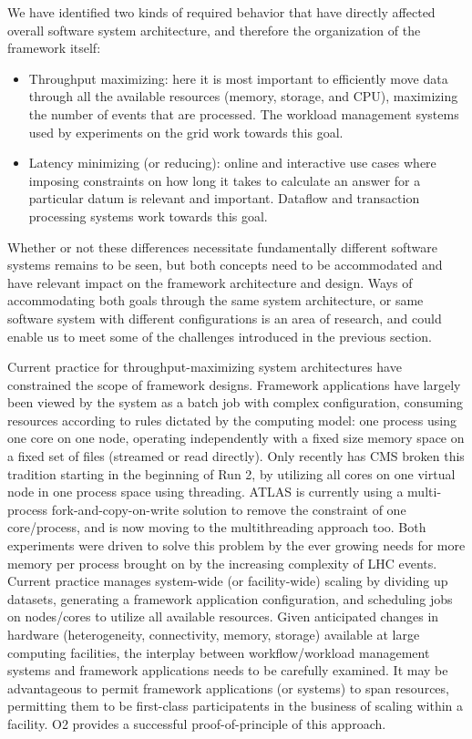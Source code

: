 \documentclass[12pt,a4paper]{article}
\begin{document}
We have identified two kinds of required behavior that have directly
affected overall software system architecture, and therefore the
organization of the framework itself:

\begin{itemize}
\item
    Throughput maximizing: here it is most important to efficiently
    move data through all the available resources (memory, storage,
    and CPU), maximizing the number of events that are processed. The
    workload management systems used by experiments on the grid work
    towards this goal.
\item
    Latency minimizing (or reducing): online and interactive use
    cases where imposing constraints on how long it takes to calculate
    an answer for a particular datum is relevant and
    important. Dataflow and transaction processing systems work
    towards this goal.
\end{itemize}

Whether or not these differences necessitate fundamentally different
software systems remains to be seen, but both concepts need to be
accommodated and have relevant impact on the framework architecture
and design. Ways of accommodating both goals through the same system
architecture, or same software system with different configurations is
an area of research, and could enable us to meet some of the
challenges introduced in the previous section.

Current practice for throughput-maximizing system architectures have
constrained the scope of framework designs. Framework applications
have largely been viewed by the system as a batch job with complex
configuration, consuming resources according to rules dictated by the
computing model: one process using one core on one node, operating
independently with a fixed size memory space on a fixed set of files
(streamed or read directly). Only recently has CMS broken this
tradition starting in the beginning of Run 2, by utilizing all cores
on one virtual node in one process space using threading. ATLAS is
currently using a multi-process fork-and-copy-on-write solution to
remove the constraint of one core/process, and is now moving to the
multithreading approach too. Both experiments were
driven to solve this problem by the ever growing needs for more
memory per process brought on by the increasing complexity of LHC
events. Current practice manages system-wide (or facility-wide)
scaling by dividing up datasets, generating a framework application
configuration, and scheduling jobs on nodes/cores to utilize all
available resources. Given anticipated changes in hardware
(heterogeneity, connectivity, memory, storage) available at large
computing facilities, the interplay between workflow/workload
management systems and framework applications needs to be carefully
examined. It may be advantageous to permit framework applications (or
systems) to span resources, permitting them to be first-class
participatents in the business of scaling within a facility. O2 provides
a successful proof-of-principle of this approach.
\end{document}
